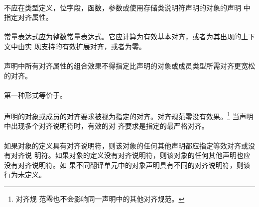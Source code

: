 \constraint
\paragraph{}
不应在类型定义，位字段，函数，参数或使用存储类说明符声明的对象的声明
中指定对齐属性。

\paragraph{}
常量表达式应为整数常量表达式。它应计算为有效基本对齐，或者为其出现的上下文中由实
现支持的有效扩展对齐，或者为零。

\paragraph{}
声明中所有对齐属性的组合效果不得指定比声明的对象或成员类型所需对齐更宽松的对齐。

\semantic
\paragraph{}
第一种形式等价于\tm{))}。

\paragraph{}
声明的对象或成员的对齐要求被视为指定的对齐。对齐规范零没有效果。\footnote{对齐规
范零也不会影响同一声明中的其他对齐规范。} 当声明中出现多个对齐说明符时，有效的对
齐要求是指定的最严格对齐。

\paragraph{}
如果对象的定义具有对齐说明符，则该对象的任何其他声明都应指定等效对齐或没有对齐说
明符。如果对象的定义没有对齐说明符，则该对象的任何其他声明也应没有对齐说明符。如
果不同翻译单元中的对象声明具有不同的对齐说明符，则该行为未定义。

\syntax
